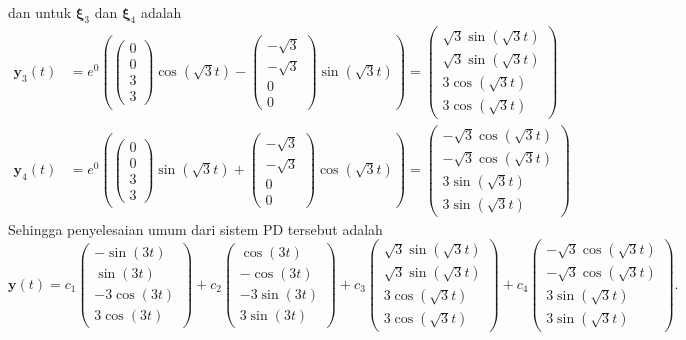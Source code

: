 \documentclass[a4paper]{article}
\theoremstyle{definisi}
\newcommand{\bfxi}{\boldsymbol{\xi}}
\numberwithin{equation}{section}
\begin{document}
\begin{enumerate}
\begin{align*}
    \end{align*} 
    dan untuk $\bfxi_3$ dan $\bfxi_4$ adalah
    \begin{align*}
      \mathbf{y}_3(t) &= e^{0}\left(\begin{pmatrix}0\\0\\3\\3\end{pmatrix}\cos(\sqrt{3}t) - \begin{pmatrix}-\sqrt{3}\\-\sqrt{3}\\0\\0\end{pmatrix}\sin(\sqrt{3}t)\right)=\begin{pmatrix}\sqrt{3}\sin(\sqrt{3}t)\\\sqrt{3}\sin(\sqrt{3}t)\\3\cos(\sqrt{3}t)\\3\cos(\sqrt{3}t)\end{pmatrix}\\
      \mathbf{y}_4(t) &= e^{0}\left(\begin{pmatrix}0\\0\\3\\3\end{pmatrix}\sin(\sqrt{3}t) + \begin{pmatrix}-\sqrt{3}\\-\sqrt{3}\\0\\0\end{pmatrix}\cos(\sqrt{3}t)\right)=\begin{pmatrix}-\sqrt{3}\cos(\sqrt{3}t)\\-\sqrt{3}\cos(\sqrt{3}t)\\3\sin(\sqrt{3}t)\\3\sin(\sqrt{3}t)\end{pmatrix}
    \end{align*}
    Sehingga penyelesaian umum dari sistem PD tersebut adalah
    \[\mathbf{y}(t) = c_1\begin{pmatrix}-\sin(3t)\\\sin(3t)\\-3\cos(3t)\\3\cos(3t)\end{pmatrix} + c_2\begin{pmatrix}\cos(3t)\\-\cos(3t)\\-3\sin(3t)\\3\sin(3t)\end{pmatrix} + c_3\begin{pmatrix}\sqrt{3}\sin(\sqrt{3}t)\\\sqrt{3}\sin(\sqrt{3}t)\\3\cos(\sqrt{3}t)\\3\cos(\sqrt{3}t)\end{pmatrix} + c_4\begin{pmatrix}-\sqrt{3}\cos(\sqrt{3}t)\\-\sqrt{3}\cos(\sqrt{3}t)\\3\sin(\sqrt{3}t)\\3\sin(\sqrt{3}t)\end{pmatrix}.\]

\end{enumerate}
\end{document}
